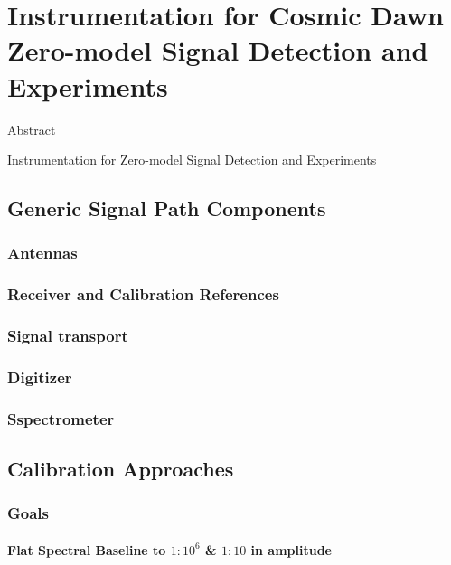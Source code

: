 \chapter{Instrumentation for Cosmic Dawn Zero-model Signal Detection and Experiments}

\begin{bf}
\author{L. J. Greenhill (Center for Astrophysics), R. Subrahmanyan (Raman Research Institute)}  
  
Abstract\\
\end{bf}

Instrumentation for Zero-model Signal Detection and Experiments

\section{Generic Signal Path Components}
\subsection{Antennas}
\subsection{Receiver and Calibration References}
\subsection{Signal transport}
\subsection{Digitizer}
\subsection{Sspectrometer}

\section{Calibration Approaches}

\subsection{Goals}

\subsubsection{Flat Spectral Baseline to $1:10^6$ \& $1:10$ in amplitude} 

